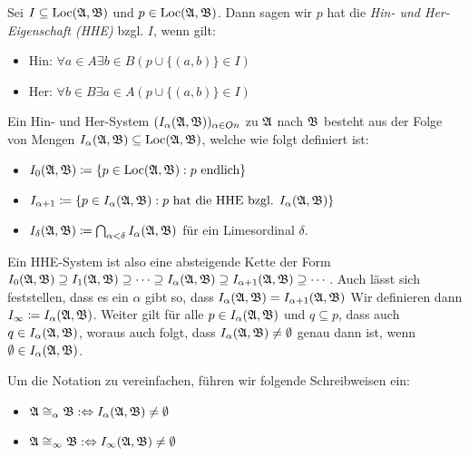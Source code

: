 \begin{definition}
	Sei $I\subseteq \operatorname{Loc}(\mathfrak{A},\mathfrak{B})$ und $p\in \operatorname{Loc}(\mathfrak{A},\mathfrak{B})$. Dann sagen wir $p$ hat die \textit{Hin- und Her-Eigenschaft (HHE)} bzgl. $I$, wenn gilt:
	\begin{itemize}
		\item Hin: $\forall a\in A \exists b\in B (p\cup\{(a,b)\}\in I)$
		\item Her: $\forall b\in B\exists a\in A (p\cup\{(a,b)\}\in I)$
	\end{itemize}
\end{definition}
\begin{definition}
	Ein Hin- und Her-System $(I_\alpha(\mathfrak{A},\mathfrak{B}))_{\alpha\in On}$ zu $\mathfrak{A}$ nach $\mathfrak{B}$ besteht aus der Folge von Mengen $I_\alpha(\mathfrak{A},\mathfrak{B})\subseteq \operatorname{Loc}(\mathfrak{A},\mathfrak{B})$, welche wie folgt definiert ist:
	\begin{itemize}
		\item $I_0(\mathfrak{A},\mathfrak{B})\coloneqq\{p\in \operatorname{Loc}(\mathfrak{A},\mathfrak{B}): p \text{ endlich}\}$
		\item $I_{\alpha+1}\coloneqq\{p\in I_\alpha(\mathfrak{A},\mathfrak{B}) : p \text{ hat die HHE bzgl. } I_\alpha(\mathfrak{A},\mathfrak{B})\}$
		\item $I_\delta(\mathfrak{A},\mathfrak{B})\coloneqq \bigcap_{\alpha<\delta}I_\alpha(\mathfrak{A},\mathfrak{B})$ für ein Limesordinal $\delta$.
	\end{itemize}
\end{definition}

Ein HHE-System ist also eine absteigende Kette der Form $I_0(\mathfrak{A},\mathfrak{B})\supseteq I_1(\mathfrak{A},\mathfrak{B}) \supseteq \cdots \supseteq I_\alpha(\mathfrak{A},\mathfrak{B}) \supseteq I_{\alpha+1}(\mathfrak{A},\mathfrak{B})\supseteq \cdots$.
Auch lässt sich feststellen, dass es ein $\alpha$ gibt so, dass $I_\alpha(\mathfrak{A},\mathfrak{B})=I_{\alpha+1}(\mathfrak{A},\mathfrak{B})$ Wir definieren dann $I_\infty\coloneqq I_\alpha(\mathfrak{A},\mathfrak{B})$.
Weiter gilt für alle $p\in I_\alpha(\mathfrak{A},\mathfrak{B})$ und $q\subseteq p$, dass auch $q\in I_\alpha(\mathfrak{A},\mathfrak{B})$, woraus auch folgt, dass $I_\alpha(\mathfrak{A},\mathfrak{B})\neq\emptyset$ genau dann ist, wenn $\emptyset\in I_\alpha(\mathfrak{A},\mathfrak{B})$.

\begin{definition}
	Um die Notation zu vereinfachen, führen wir folgende Schreibweisen ein:
	\begin{itemize}
		\item $\mathfrak{A}\cong_\alpha\mathfrak{B} :\Leftrightarrow I_\alpha(\mathfrak{A},\mathfrak{B})\neq\emptyset$
		\item $\mathfrak{A}\cong_\infty\mathfrak{B} :\Leftrightarrow I_\infty(\mathfrak{A},\mathfrak{B})\neq \emptyset$
	\end{itemize}
\end{definition}

